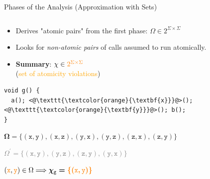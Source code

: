 \documentclass[10pt, xcolor=pdflatex, hyperref={unicode}, aspectratio=169]{beamer}
\begin{document}
\begin{frame}[fragile]{Phases of the Analysis (Approximation with Sets)}
\begin{columns}
\begin{column}[T]{.45 \linewidth}
            \begin{itemize}
                \item Derives "\alert{atomic pairs}" from the first phase: $ \Omega \in 2^{\Sigma \times \Sigma} $

                \item Looks for \emph{non-atomic pairs} of calls assumed to \alert{run atomically}.

                \item \textbf{Summary}: $ \chi \in \textcolor{orange}{2^{\Sigma \times \Sigma}} $ \\
                    (\textcolor{orange}{set of atomicity violations})
            \end{itemize}

            \medskip

\begin{lstlisting}
void g() {
  a(); <@\texttt{\textcolor{orange}{\textbf{x}}}@>(); <@\texttt{\textcolor{orange}{\textbf{y}}}@>(); b();
}
\end{lstlisting}

            \medskip
            \centering
            \footnotesize

            $ \boldsymbol{\Omega = \{(\mathtt{x, y}), (\mathtt{x, z}), (\mathtt{y, x}), (\mathtt{y, z}), (\mathtt{z, x}), (\mathtt{z, y})\}} $

            \smallskip

            \textcolor{gray}{$ \Omega^\prime = \{(\mathtt{x, y}), (\mathtt{y, z}), (\mathtt{z, y}), (\mathtt{y, x})\} $}

            \smallskip

            $ (\mathtt{\textcolor{orange}{\boldsymbol{\mathtt{x}}}, \textcolor{orange}{\boldsymbol{\mathtt{y}}}}) \in \Omega \Longrightarrow \boldsymbol{\chi_\mathtt{g} = \textcolor{orange}{\{(\mathtt{x, y})\}}} $
        \end{column}
    \end{columns}
\end{frame}


\end{document}
